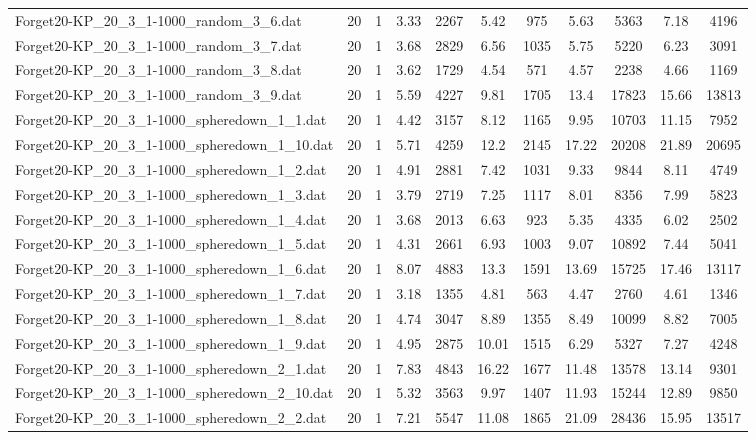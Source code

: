 \begin{table}[!ht]
\begin{tabular}{lcccccccccc}
Forget20-KP\_20\_3\_1-1000\_random\_3\_6.dat & 20 & 1 & 3.33 & 2267 & 5.42 & 975 & 5.63 & 5363 & 7.18 & 4196 \\
Forget20-KP\_20\_3\_1-1000\_random\_3\_7.dat & 20 & 1 & 3.68 & 2829 & 6.56 & 1035 & 5.75 & 5220 & 6.23 & 3091 \\
Forget20-KP\_20\_3\_1-1000\_random\_3\_8.dat & 20 & 1 & 3.62 & 1729 & 4.54 & 571 & 4.57 & 2238 & 4.66 & 1169 \\
Forget20-KP\_20\_3\_1-1000\_random\_3\_9.dat & 20 & 1 & 5.59 & 4227 & 9.81 & 1705 & 13.4 & 17823 & 15.66 & 13813 \\
Forget20-KP\_20\_3\_1-1000\_spheredown\_1\_1.dat & 20 & 1 & 4.42 & 3157 & 8.12 & 1165 & 9.95 & 10703 & 11.15 & 7952 \\
Forget20-KP\_20\_3\_1-1000\_spheredown\_1\_10.dat & 20 & 1 & 5.71 & 4259 & 12.2 & 2145 & 17.22 & 20208 & 21.89 & 20695 \\
Forget20-KP\_20\_3\_1-1000\_spheredown\_1\_2.dat & 20 & 1 & 4.91 & 2881 & 7.42 & 1031 & 9.33 & 9844 & 8.11 & 4749 \\
Forget20-KP\_20\_3\_1-1000\_spheredown\_1\_3.dat & 20 & 1 & 3.79 & 2719 & 7.25 & 1117 & 8.01 & 8356 & 7.99 & 5823 \\
Forget20-KP\_20\_3\_1-1000\_spheredown\_1\_4.dat & 20 & 1 & 3.68 & 2013 & 6.63 & 923 & 5.35 & 4335 & 6.02 & 2502 \\
Forget20-KP\_20\_3\_1-1000\_spheredown\_1\_5.dat & 20 & 1 & 4.31 & 2661 & 6.93 & 1003 & 9.07 & 10892 & 7.44 & 5041 \\
Forget20-KP\_20\_3\_1-1000\_spheredown\_1\_6.dat & 20 & 1 & 8.07 & 4883 & 13.3 & 1591 & 13.69 & 15725 & 17.46 & 13117 \\
Forget20-KP\_20\_3\_1-1000\_spheredown\_1\_7.dat & 20 & 1 & 3.18 & 1355 & 4.81 & 563 & 4.47 & 2760 & 4.61 & 1346 \\
Forget20-KP\_20\_3\_1-1000\_spheredown\_1\_8.dat & 20 & 1 & 4.74 & 3047 & 8.89 & 1355 & 8.49 & 10099 & 8.82 & 7005 \\
Forget20-KP\_20\_3\_1-1000\_spheredown\_1\_9.dat & 20 & 1 & 4.95 & 2875 & 10.01 & 1515 & 6.29 & 5327 & 7.27 & 4248 \\
Forget20-KP\_20\_3\_1-1000\_spheredown\_2\_1.dat & 20 & 1 & 7.83 & 4843 & 16.22 & 1677 & 11.48 & 13578 & 13.14 & 9301 \\
Forget20-KP\_20\_3\_1-1000\_spheredown\_2\_10.dat & 20 & 1 & 5.32 & 3563 & 9.97 & 1407 & 11.93 & 15244 & 12.89 & 9850 \\
Forget20-KP\_20\_3\_1-1000\_spheredown\_2\_2.dat & 20 & 1 & 7.21 & 5547 & 11.08 & 1865 & 21.09 & 28436 & 15.95 & 13517 \\

\end{tabular}
\end{table}
